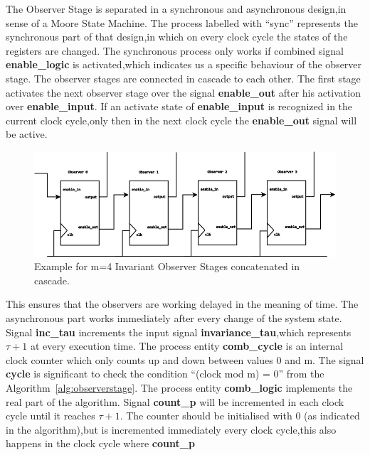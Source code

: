The Observer Stage is separated in a synchronous and asynchronous design,in sense of a Moore State Machine.
The process labelled with ``sync'' represents the synchronous part of that design,in which on every clock cycle 
the states of the registers are changed.
The synchronous process only works if combined signal \textbf{enable\_logic} is activated,which indicates us a specific behaviour of the 
observer stage. The observer stages are connected in cascade to each other. The first stage activates the next observer stage over the signal
\textbf{enable\_out} after his activation over \textbf{enable\_input}.
If an activate state of \textbf{enable\_input} is recognized in the current clock cycle,only then in the next clock cycle the \textbf{enable\_out} signal will
be active.   
%
\begin{center}
\begin{figure}[h]
\includegraphics[width=450px]{Chapter2/Figs/Raster/Observer-stage.png}
\caption[Invariant Observer stages in cascade , m=4]{Example for m=4 Invariant Observer Stages concatenated in cascade. }
\label{fig:observerstages}
\end{figure}
\end{center}
This ensures that the observers are working delayed in the meaning of time.
The asynchronous part works immediately after every change of the system state.  
Signal \textbf{inc\_tau} increments the input signal \textbf{invariance\_tau},which represents $\tau+1$ at every execution time.
The process entity \textbf{comb\_cycle} is an internal clock counter which only counts up and down between values 0 and m.
The signal \textbf{cycle} is significant to check the condition ``(clock mod m) = 0'' from the Algorithm~\ref{alg:observerstage}.
The process entity \textbf{comb\_logic} implements the real part of the algorithm.
Signal \textbf{count\_p} will be incremented in each clock cycle until it reaches $\tau+1$.
The counter should be initialised with 0 (as indicated in the algorithm),but is incremented immediately every clock cycle,this also happens in the clock cycle where \textbf{count\_p}
